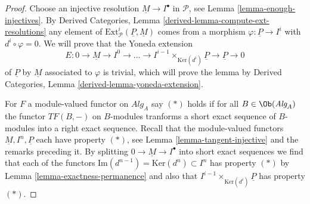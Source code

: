 \begin{proof}
Choose an injective resolution $\underline{M} \to I^\bullet$ in
$\mathcal{P}$, see
Lemma \ref{lemma-enough-injectives}.
By
Derived Categories, Lemma \ref{derived-lemma-compute-ext-resolutions}
any element of $\text{Ext}^i_\mathcal{P}(\underline{P}, \underline{M})$
comes from a morphism $\varphi : \underline{P} \to I^i$ with
$d^i \circ \varphi = 0$. We will prove that the
Yoneda extension
$$
E : 0 \to \underline{M} \to I^0 \to \ldots \to
I^{i - 1} \times_{\text{Ker}(d^i)} \underline{P} \to \underline{P} \to 0
$$
of $\underline{P}$ by $\underline{M}$
associated to $\varphi$ is trivial, which will prove the lemma by
Derived Categories, Lemma \ref{derived-lemma-yoneda-extension}.

\medskip\noindent
For $F$ a module-valued functor on $\textit{Alg}_A$
say $(*)$ holds if for all $B \in \Ob(\textit{Alg}_A)$ the
functor $TF(B, -)$ on $B$-modules tranforms a short exact sequence
of $B$-modules into a right exact sequence.
Recall that the module-valued functors $\underline{M}, I^n, \underline{P}$
each have property $(*)$, see
Lemma \ref{lemma-tangent-injective}
and the remarks preceding it.
By splitting $0 \to \underline{M} \to I^\bullet$ into short
exact sequences we find that each of the functors
$\text{Im}(d^{n - 1}) = \text{Ker}(d^n) \subset I^n$ has property $(*)$ by
Lemma \ref{lemma-exactness-permanence}
and also that $I^{i - 1} \times_{\text{Ker}(d^i)} \underline{P}$ has property
$(*)$.


\end{proof}
